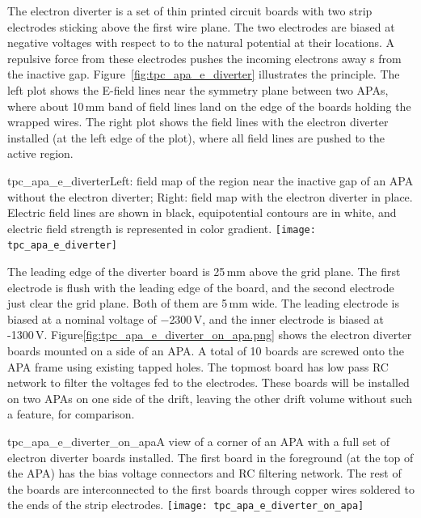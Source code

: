The electron diverter is a set of thin printed circuit boards with two strip electrodes sticking above the first wire plane.  The two electrodes are biased at %
negative voltages with respect to to the natural potential at their locations.  A repulsive force from these electrodes pushes the incoming electrons away s%
from the inactive gap.  Figure~\ref{fig:tpc_apa_e_diverter} illustrates the principle. The left plot shows the E-field lines near the symmetry plane between two APAs, where about 10\,mm band of field lines land on the edge of the boards holding the wrapped wires.  The right plot shows the field lines with the electron diverter installed (at the left edge of the plot), where all field lines are pushed to the active region.

\begin{cdrfigure}{tpc_apa_e_diverter}{Left: field map of the region near the inactive gap of an APA without the electron diverter; Right: field map with the electron diverter in place.
Electric field lines are shown in black, equipotential contours are in white, and electric field strength is represented in color gradient.}
\texttt{[image: tpc\_apa\_e\_diverter]} 
\end{cdrfigure}

 
The leading edge of the diverter board is 25\,mm above the grid plane.  The first electrode is flush with the leading edge of the board, and the second electrode just clear the grid plane.  Both of them are 5\,mm wide.  The leading electrode is biased at a nominal voltage of $-$2300\,V, and the inner electrode is biased at -1300\,V.     Figure\ref{fig:tpc_apa_e_diverter_on_apa.png} shows the electron diverter boards mounted on a side of an APA.  A total of 10 boards are screwed onto the APA frame using existing tapped holes.  The topmost board has low pass RC network to filter the voltages fed to the electrodes.  These boards will be installed on two APAs on one side of the drift, leaving the other drift volume without such a feature, for comparison.
 
 \begin{cdrfigure}{tpc_apa_e_diverter_on_apa}{A view of a corner of an APA with a full set of electron diverter boards installed.  The first board in the foreground (at the top of the APA) has the bias voltage connectors and RC filtering network.  The rest of the boards are interconnected to the first boards through copper wires soldered to the ends of the strip electrodes.}
\texttt{[image: tpc\_apa\_e\_diverter\_on\_apa]} 
\end{cdrfigure}


